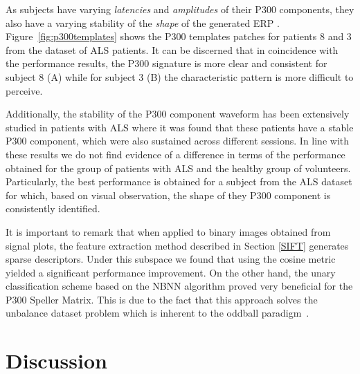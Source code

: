 \documentclass[utf8]{frontiersSCNS} %
\begin{document}

As subjects have varying \textit{latencies} and \textit{amplitudes} of their P300 components, they also have a varying stability of the \textit{shape} of the generated ERP \citep{Nam2010}.  Figure~\ref{fig:p300templates} shows the P300 templates patches for patients 8 and 3 from the dataset of ALS patients. It can be discerned that in coincidence with the performance results, the P300 signature is more clear and consistent for subject 8 (A) while for subject 3 (B) the characteristic pattern is more difficult to perceive.

Additionally, the stability of the P300 component waveform has been extensively studied in patients with ALS \citep{SellersandEmanuelDonchin2006,TomohiroMadarame2008,Nijboer2009,Mak2012,McCane2015} where it was found that these patients have a stable P300 component, which were also sustained across different sessions.  In line with these results we do not find evidence of a difference in terms of the performance obtained for the group of patients with ALS and the healthy group of volunteers. Particularly, the best performance is obtained for a subject from the ALS dataset for which, based on visual observation, the shape of they P300 component is consistently identified.


It is important to remark that when applied to binary images obtained from signal plots, the feature extraction method described in Section \ref{SIFT} generates sparse descriptors.  Under this subspace we found that using the cosine metric yielded a significant performance improvement. On the other hand, the unary classification scheme based on the NBNN algorithm proved very beneficial for the P300 Speller Matrix.  This is due to the fact that this approach solves the unbalance dataset problem which is inherent to the oddball paradigm~\citep{Tibon2015}.  


\section{Discussion}
\label{discussion}
\end{document}
